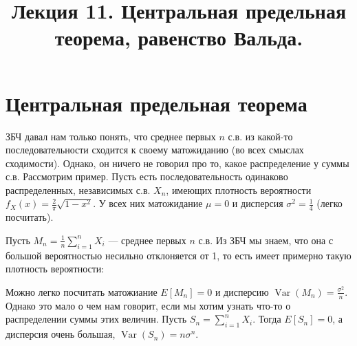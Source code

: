 \documentclass[12pt]{article}
\title{Лекция 11. Центральная предельная теорема, равенство Вальда.}
\DeclareMathOperator{\Var}{Var}
\begin{document}
\maketitle

\section{Центральная предельная теорема}

ЗБЧ давал нам только понять, что среднее первых $n$ с.в. из какой-то последовательности сходится к своему матожиданию (во всех смыслах сходимости). Однако, он ничего не говорил про то, какое распределение у суммы с.в. Рассмотрим пример. Пусть есть последовательность одинаково распределенных, независимых с.в. $X_n$, имеющих плотность вероятности $f_X(x) = \frac{2}{\pi}\sqrt{1 - x^2}$. У всех них матожидание $\mu = 0$ и дисперсия $\sigma^2 = \frac{1}{4}$ (легко посчитать).

\begin{center}
\end{center}

Пусть $M_n = \frac{1}{n} \sum_{i = 1}^n X_i$ --- среднее первых $n$ с.в. Из ЗБЧ мы знаем, что она с большой вероятностью несильно отклоняется от 1, то есть имеет примерно такую плотность вероятности:

\begin{center}
\end{center}

Можно легко посчитать матожиание $E[M_n] = 0$ и дисперсию $\Var(M_n) = \frac{\sigma^2}{n}$. Однако это мало о чем нам говорит, если мы хотим узнать что-то о распределении суммы этих величин. Пусть $S_n = \sum_{i = 1}^n X_i$. Тогда $E[S_n] = 0$, а дисперсия очень большая, $\Var(S_n) = n\sigma^n$.
\end{document}
